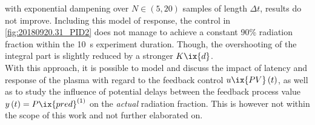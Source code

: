 %
            with exponential dampening over $N\in\left(5,20\right)$ samples of length $\Delta t$, results do not improve. Including this model of response, the control in \cref{fig:20180920.31_PID2} does not manage to achieve a constant 90\% radiation fraction within the \SI{10}{\second} experiment duration. Though, the overshooting of the integral part is slightly reduced by a stronger $K\ix{d}$.\\%
            With this approach, it is possible to model and discuss the impact of latency and response of the plasma with regard to the feedback control $u\ix{PV}\left(t\right)$, as well as to study the influence of potential delays between the feedback process value $y\left(t\right)=P\ix{pred}^{\left(1\right)}$ on the \textit{actual} radiation fraction. This is however not within the scope of this work and not further elaborated on.%
%
